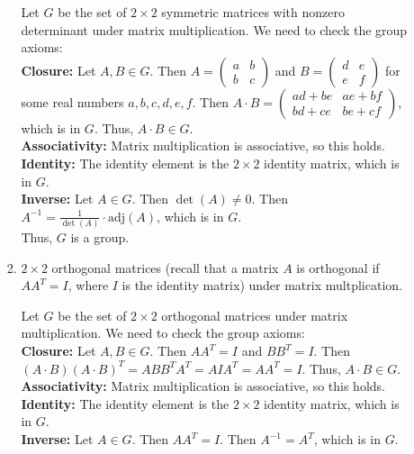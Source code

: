 \documentclass[10pt,twoside]{article}
\begin{document}
\begin{itemize}
\begin{enumerate}
\begin{enumerate}
			\begin{solution}
                Let $G$ be the set of $2 \times 2$ symmetric matrices with nonzero determinant under matrix multiplication. We need to check the group axioms: \\ 
                \textbf{Closure:} Let $A, B \in G$. Then $A = \begin{pmatrix} a & b \\ b & c \end{pmatrix}$ and $B = \begin{pmatrix} d & e \\ e & f \end{pmatrix}$ for some real numbers $a, b, c, d, e, f$. Then $A \cdot B = \begin{pmatrix} ad + be & ae + bf \\ bd + ce & be + cf \end{pmatrix}$, which is in $G$. Thus, $A \cdot B \in G$. \\
                \textbf{Associativity:} Matrix multiplication is associative, so this holds. \\
                \textbf{Identity:} The identity element is the $2 \times 2$ identity matrix, which is in $G$. \\
                \textbf{Inverse:} Let $A \in G$. Then $\det(A) \neq 0$. Then $A^{-1} = \frac{1}{\det(A)} \cdot \text{adj}(A)$, which is in $G$. \\
                Thus, $G$ is a group.
            \end{solution}
			\item $2 \times 2$ orthogonal matrices (recall that a matrix $A$ is orthogonal if $A A^T = I$, where $I$ is the identity matrix) under matrix multplication.
			\begin{solution}
                Let $G$ be the set of $2 \times 2$ orthogonal matrices under matrix multiplication. We need to check the group axioms: \\
                \textbf{Closure:} Let $A, B \in G$. Then $A A^T = I$ and $B B^T = I$. Then $(A \cdot B) (A \cdot B)^T = A B B^T A^T = A I A^T = A A^T = I$. Thus, $A \cdot B \in G$. \\
                \textbf{Associativity:} Matrix multiplication is associative, so this holds. \\
                \textbf{Identity:} The identity element is the $2 \times 2$ identity matrix, which is in $G$. \\
                \textbf{Inverse:} Let $A \in G$. Then $A A^T = I$. Then $A^{-1} = A^T$, which is in $G$. \\

\end{solution}
\end{enumerate}
\end{enumerate}
\end{itemize}
\end{document}
